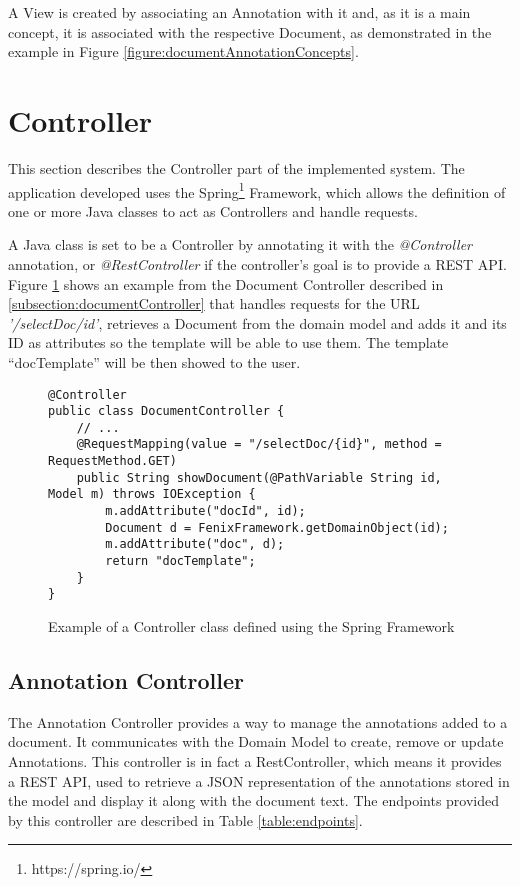 A View is created by associating an Annotation with it and, as it is a main concept, it is associated with the respective Document, as demonstrated in the example in Figure \ref{figure:documentAnnotationConcepts}.

\section{Controller}

This section describes the Controller part of the implemented system. The application developed uses the Spring\footnote{https://spring.io/} Framework, which allows the definition of one or more Java classes to act as Controllers and handle requests.

A Java class is set to be a Controller by annotating it with the \textit{@Controller} annotation, or \textit{@RestController} if the controller's goal is to provide a REST API. Figure \ref{figure:springController} shows an example from the Document Controller described in \ref{subsection:documentController} that handles requests for the URL \textit{'/selectDoc/{id}'}, retrieves a Document from the domain model and adds it and its ID as attributes so the template will be able to use them. The template ``docTemplate'' will be then showed to the user.

\begin{figure}[h]
\lstset{style=customjava}
\begin{lstlisting}
@Controller
public class DocumentController {
	// ...
	@RequestMapping(value = "/selectDoc/{id}", method = RequestMethod.GET)
	public String showDocument(@PathVariable String id, Model m) throws IOException {
		m.addAttribute("docId", id);
		Document d = FenixFramework.getDomainObject(id);
		m.addAttribute("doc", d);
		return "docTemplate";
	}
}	
\end{lstlisting}
\caption{Example of a Controller class defined using the Spring Framework} 
\label{figure:springController}
\end{figure}

\subsection{Annotation Controller}
The Annotation Controller provides a way to manage the annotations added to a document. It communicates with the Domain Model to create, remove or update Annotations. This controller is in fact a RestController, which means it provides a REST API, used to retrieve a JSON representation of the annotations stored in the model and display it along with the document text. 
The endpoints provided by this controller are described in Table \ref{table:endpoints}.

